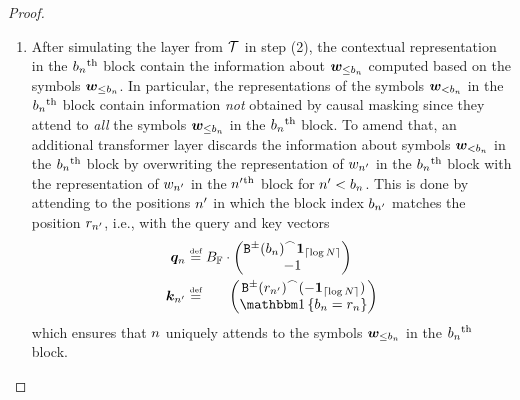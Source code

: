 \begin{proof}
\begin{enumerate}[label=(\arabic*)]
      This ensures that the attention scores are non-zero only for 
      \item After simulating the layer from ${{\mathcal{T}}}$ in step (2), the contextual representation in the ${{b}}_{{{n}}}\textsuperscript{th}$ block contain the information about ${{\boldsymbol{w}}}_{\leq {{b}}_{{{n}}}}$ computed based on the symbols ${{\boldsymbol{w}}}_{\leq {{b}}_{{{n}}}}$.
      In particular, the representations of the symbols ${{\boldsymbol{w}}}_{< {{b}}_{{{n}}}}$ in the ${{b}}_{{{n}}}\textsuperscript{th}$ block contain information \emph{not} obtained by causal masking since they attend to \emph{all} the symbols ${{\boldsymbol{w}}}_{\leq {{b}}_{{{n}}}}$ in the ${{b}}_{{{n}}}\textsuperscript{th}$ block.
      To amend that, an additional transformer layer discards the information about symbols ${{\boldsymbol{w}}}_{< {{b}}_{{{n}}}}$ in the ${{b}}_{{{n}}}\textsuperscript{th}$ block by overwriting the representation of ${{w}}_{{{n}}'}$ in the ${{b}}_{{{n}}}\textsuperscript{th}$ block with the representation of ${{w}}_{{{n}}'}$ in the ${{n}}'\textsuperscript{th}$ block for ${{n}}' < {{b}}_{{{n}}}$.
      This is done by attending to the positions ${{n}}'$ in which the block index ${{b}}_{{{n}}'}$ matches the position ${{r}}_{{{n}}'}$, i.e., with the query and key vectors
      \begin{subequations}
         \begin{align}
            \vq_\stridx &\defeq \maxFNum \cdot 
            \begin{pmatrix}
               \interleaveFun{\sbinFun{\paddingBlock_\stridx}}{\one_{\ceil{\log\strlen}}} \\
               -1
            \end{pmatrix} \\
            \vk_{\stridx'} &\defeq \phantom{\maxFNum \cdot} 
            \begin{pmatrix}
               \interleaveFun{\sbinFun{\relativePos_{\stridx'}}}{(-\one_{\ceil{\log\strlen}})} \\
               \ind{\paddingBlock_\stridx = \relativePos_{\stridx}}
            \end{pmatrix}
         \end{align}
      \end{subequations}
      which ensures that ${{n}}$ uniquely attends to the symbols ${{\boldsymbol{w}}}_{\leq {{b}}_{{n}}}$ in the ${{b}}_{{{n}}}\textsuperscript{th}$ block.
   \end{enumerate}
\end{proof}



